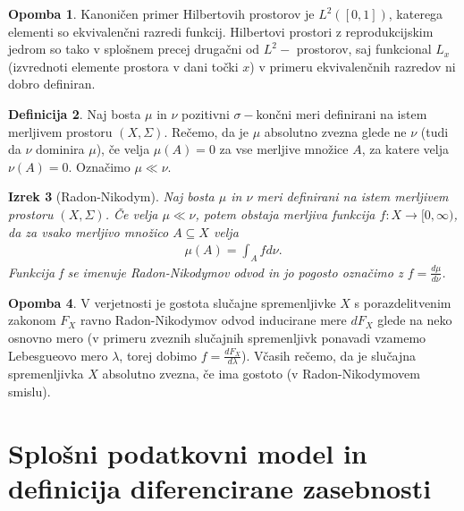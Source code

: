 \documentclass[12pt,a4paper]{amsart}
\theoremstyle{definition} %
\newtheorem{definicija}{Definicija}[section]
\newtheorem{opomba}[definicija]{Opomba}
\theoremstyle{plain} %
\newtheorem{izrek}[definicija]{Izrek}
\begin{document}
\begin{opomba}
Kanoničen primer Hilbertovih prostorov je $L^2 ([0,1])$, katerega elementi so ekvivalenčni razredi funkcij. Hilbertovi prostori z reprodukcijskim jedrom so tako v splošnem precej drugačni od $L^2-$ prostorov, saj funkcional $L_x$ (izvrednoti elemente prostora v dani točki $x$) v primeru ekvivalenčnih razredov ni dobro definiran.
\end{opomba}
\begin{definicija} 
Naj bosta $\mu$ in $\nu$ pozitivni $\sigma-$končni meri definirani na istem merljivem prostoru $(X, \Sigma)$. Rečemo, da je $\mu$ absolutno zvezna glede ne $\nu$ (tudi da $\nu$ dominira $\mu$), če velja $\mu(A) = 0$ za vse merljive množice $A$, za katere velja $\nu(A)=0$. Označimo $\mu \ll \nu$.
\end{definicija}

\begin{izrek} [Radon-Nikodym]
Naj bosta $\mu$ in $\nu$ meri definirani na istem merljivem prostoru $(X, \Sigma)$. Če velja  $\mu \ll \nu$, potem obstaja merljiva funkcija $f : X \rightarrow [0,\infty)$, da za vsako merljivo množico $A \subseteq X$ velja
\begin{gather*}
\mu(A) = \int_A f d \nu .
\end{gather*}
Funkcija f se imenuje Radon-Nikodymov odvod in jo pogosto označimo z $f= \frac{d\mu}{d \nu}$.
\end{izrek}



\begin{opomba}
V verjetnosti je gostota slučajne spremenljivke $X$ s porazdelitvenim zakonom $F_X$ ravno Radon-Nikodymov odvod inducirane mere $dF_X$ glede na neko osnovno mero (v primeru zveznih slučajnih spremenljivk ponavadi vzamemo Lebesgueovo mero $\lambda$, torej dobimo $f=\frac{dF_X}{d \lambda}$). Včasih rečemo, da je slučajna spremenljivka $X$ absolutno zvezna, če ima gostoto (v Radon-Nikodymovem smislu).
\end{opomba}

\section{Splošni podatkovni model in definicija diferencirane zasebnosti}
\end{document}
